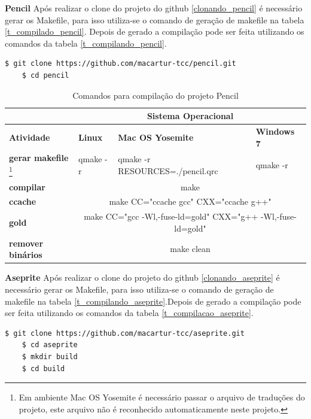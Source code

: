 \begin{itemize}
    \subitem \textbf{Pencil}
    \subitem Após realizar o clone do projeto do github
\ref{clonando_pencil} é necessário  gerar os Makefile,
 para isso utiliza-se o comando de geração de makefile na tabela \ref{t_compilado_pencil}.
Depois de gerado  a compilação pode ser feita utilizando
 os comandos da tabela \ref{t_compilando_pencil}.

\begin{lstlisting}[language=bash, caption={Clonado Projeto Pencil},
                  label=clonando_pencil]
    $ git clone https://github.com/macartur-tcc/pencil.git
    $ cd pencil
\end{lstlisting}


\begin{table}[h]
\begin{tabular}{p{2cm}p{2cm}p{2cm}p{2cm}}
\toprule
 & \multicolumn{3}{c}{Sistema Operacional} \\ \toprule 
\textbf{Atividade} & \textbf{Linux} & \textbf{Mac OS Yosemite} & \textbf{Windows 7}  \\ \midrule 
\textbf{gerar makefile}
\footnote{Em ambiente Mac OS Yosemite é necessário passar o arquivo de traduções do projeto, este arquivo não é reconhecido automaticamente neste projeto.}
 & qmake -r & qmake -r RESOURCES=./pencil.qrc  & qmake -r \\ \midrule
\textbf{compilar} & \multicolumn{3}{c}{make } \\ \midrule
\textbf{ccache} & \multicolumn{3}{c}{make CC="ccache gcc" CXX="ccache g++"} \\ \midrule
\textbf{gold} & \multicolumn{3}{c}{make CC="gcc -Wl,-fuse-ld=gold" CXX="g++ -Wl,-fuse-ld=gold"} \\ \midrule
\textbf{remover binários} & \multicolumn{3}{c}{make clean} \\ \bottomrule
\end{tabular} 
\caption{Comandos para compilação do projeto Pencil}
\label{t_compilacao_pencil}
\end{table}



    \subitem \textbf{Aseprite}
    \subitem Após realizar o clone do projeto do github
\ref{clonando_aseprite} é necessário  gerar os Makefile,
 para isso utiliza-se o comando de geração de makefile na tabela 
\ref{t_compilando_aseprite}.Depois de gerado a compilação pode
 ser feita utilizando os comandos da tabela \ref{t_compilacao_aseprite}.

\begin{lstlisting}[language=bash, caption={Clonado Projeto Aseprite e criando diretório de Compilação},
                  label=clonando_aseprite]
    $ git clone https://github.com/macartur-tcc/aseprite.git
    $ cd aseprite
    $ mkdir build
    $ cd build
\end{lstlisting}



\end{itemize}
